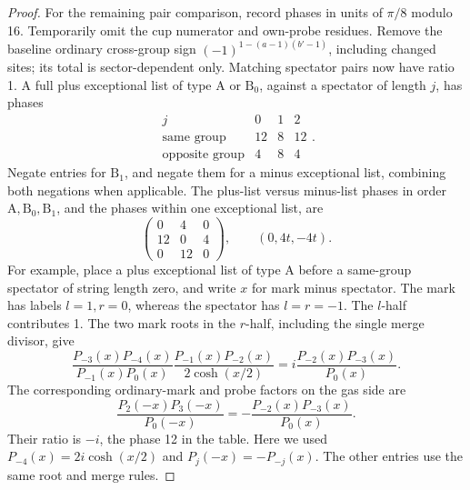 \begin{proof}
For the remaining pair comparison, record phases in units of \(\pi/8\)
modulo 16.  Temporarily omit the cup numerator and own-probe residues.
Remove the baseline ordinary cross-group sign
\((-1)^{1-(a-1)(b'-1)}\), including changed sites; its total is
sector-dependent only.  Matching spectator pairs now have ratio 1.
A full plus exceptional list of type \(\mathrm A\) or
\(\mathrm B_0\), against a spectator of length \(j\), has phases
\[
\begin{array}{c|ccc}
 j&0&1&2\\ \hline
 \text{same group}&12&8&12\\
 \text{opposite group}&4&8&4
\end{array}.
\]
Negate entries for \(\mathrm B_1\), and negate them for a minus
exceptional list, combining both negations when applicable.  The
plus-list versus minus-list phases in order
\(\mathrm A,\mathrm B_0,\mathrm B_1\), and the phases within one
exceptional list, are
\[
 \begin{pmatrix}0&4&0\\12&0&4\\0&12&0\end{pmatrix},
                         \qquad (0,4t,-4t).
\]
For example, place a plus exceptional list of type \(\mathrm A\)
before a same-group spectator of string length zero, and write \(x\)
for mark minus spectator.  The mark has labels \(l=1,r=0\), whereas
the spectator has \(l=r=-1\).  The \(l\)-half contributes 1.
The two mark roots in the \(r\)-half, including the single merge
divisor, give
\[
 \frac{P_{-3}(x)P_{-4}(x)}{P_{-1}(x)P_0(x)}
 \frac{P_{-1}(x)P_{-2}(x)}{2\cosh(x/2)}
 =i\frac{P_{-2}(x)P_{-3}(x)}{P_0(x)}.
\]
The corresponding ordinary-mark and probe factors on the gas side are
\[
 \frac{P_2(-x)P_3(-x)}{P_0(-x)}
 =-\frac{P_{-2}(x)P_{-3}(x)}{P_0(x)}.
\]
Their ratio is \(-i\), the phase 12 in the table.  Here we used
\(P_{-4}(x)=2i\cosh(x/2)\) and \(P_j(-x)=-P_{-j}(x)\).
The other entries use the same root and merge rules.


\end{proof}
